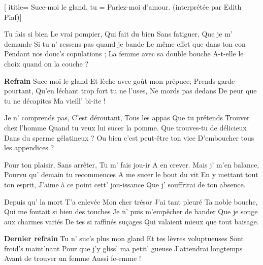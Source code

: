  [
ititle= {Suce-moi le gland},
tu = {Parlez-moi d'amour. (interprétée par Edith Piaf)}]

\beginverse
Tu fais si bien
Le vrai pompier,
Qui fait du bien
Sans fatiguer,
Que je m' demande
Si tu n' ressens pas quand je bande
Le même effet que dans ton con
Pendant nos douc's copulations ;
La femme avec sa double bouche
A-t-elle le choix quand on la couche ?
\endverse

\beginchorus
\textbf {Refrain}
Suce-moi le gland
Et lèche avec goût mon prépuce;
Prends garde pourtant,
Qu'en léchant trop fort tu ne l'uses,
Ne mords pas dedans
De peur que tu ne décapites
Ma vieill' bi-ite !
\endchorus

\beginverse
Je n' comprends pas,
C'est déroutant,
Tous les appas
Que tu prétends
Trouver chez l'homme
Quand tu veux lui sucer la pomme.
Que trouves-tu de délicieux
Dans du sperme gélatineux ?
Ou bien c'est peut-être ton vice
D'emboucher tous les appendices ?
\endverse

\beginverse
Pour ton plaisir,
Sans arrêter,
Tu m' fais jou-ir
A en crever.
Mais j' m'en balance,
Pourvu qu' demain tu recommences
A me sucer le bout du vit
En y mettant tout ton esprit,
J'aime à ce point cett' jou-issance
Que j' souffrirai de ton absence.
\endverse

\beginverse
Depuis qu' la mort
T'a enlevée
Mon cher trésor
J'ai tant pleuré
Ta noble bouche,
Qui me foutait si bien des touches
Je n' puis m'empêcher de bander
Que je songe aux charmes variés
De tes si raffinés suçages
Qui valaient mieux que tout baisage.
\endverse

\beginchorus
\textbf {Dernier refrain}
Tu n' suc's plus mon gland
Et tes lèvres voluptueuses
Sont froid's maint'nant
Pour que j'y gliss' ma petit' gueuse
J'attendrai longtemps
Avant de trouver un femme
Aussi fe-emme !
\endchorus

\endsong